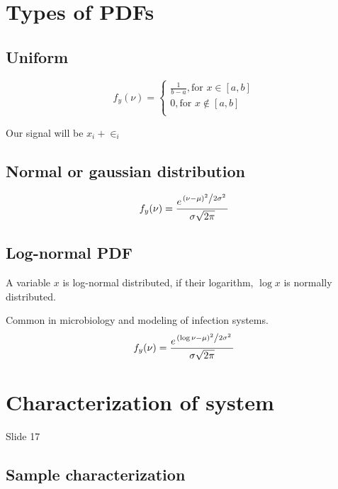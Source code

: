 \documentclass[../main/main.tex]{subfiles}
\begin{document}
\section{Types of PDFs}


\subsection{Uniform}

\begin{equation}
	f_y(\nu)=
	\begin{cases}
		\frac{1}{b-a}, \textrm{for $x \in [a,b]$} \\
		0, \textrm{for $x \notin [a,b]$}          \\
	\end{cases}
\end{equation}


Our signal will be $x_i + \in_i$

\subsection{Normal or gaussian distribution}

\begin{equation}
	f_y(\nu)= \frac{e^ {\flatfrac{(\nu - \mu)^2}{2\sigma^2}}}{\sigma \sqrt{2\pi}}
\end{equation}



\subsection{Log-normal PDF}
A variable $x$ is log-normal distributed, if their logarithm, $\log x$ is normally distributed.

Common in microbiology and modeling of infection systems.
\begin{equation}
	f_y(\nu)= \frac{e^ {\flatfrac{(\log\nu - \mu)^2}{2\sigma^2}}}{\sigma \sqrt{2\pi}}
\end{equation}

\section{Characterization of system}

Slide 17

\subsection{Sample characterization}
\end{document}
